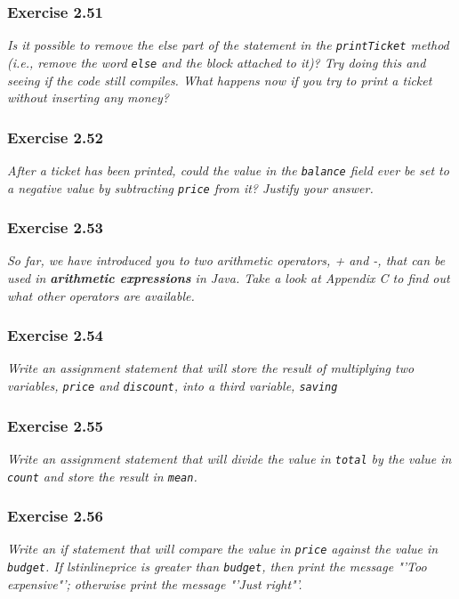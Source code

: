 \subsubsection*{Exercise 2.51}
\textit{Is it possible to remove the else part of the statement in the 
\lstinline{printTicket} method (i.e., remove the word \lstinline{else} and the 
block attached to it)? Try doing this and seeing if the code still compiles. 
What happens now if you try to print a ticket without inserting any money? }\\

\subsubsection*{Exercise 2.52}
\textit{After a ticket has been printed, could the value in the 
\lstinline{balance} field ever be set to a negative value by subtracting 
\lstinline{price} from it? Justify your answer. }\\

\subsubsection*{Exercise 2.53}
\textit{So far, we have introduced you to two arithmetic operators, + and -, 
that can be used in \textbf{arithmetic expressions} in Java. Take a look at 
Appendix C to find out what other operators are available. }\\

\subsubsection*{Exercise 2.54}
\textit{Write an assignment statement that will store the result of 
multiplying two variables, \lstinline{price} and \lstinline{discount}, into a 
third variable, \lstinline{saving}}\\

\subsubsection*{Exercise 2.55}
\textit{Write an assignment statement that will divide the value in 
\lstinline{total} by the value in \lstinline{count} and store the result in 
\lstinline{mean}. }\\

\subsubsection*{Exercise 2.56}
\textit{Write an if statement that will compare the value in \lstinline{price} 
against the value in \lstinline{budget}. If lstinline{price} is greater than 
\lstinline{budget}, then print the message "'Too expensive"'; otherwise print 
the message "'Just right"'. }\\

